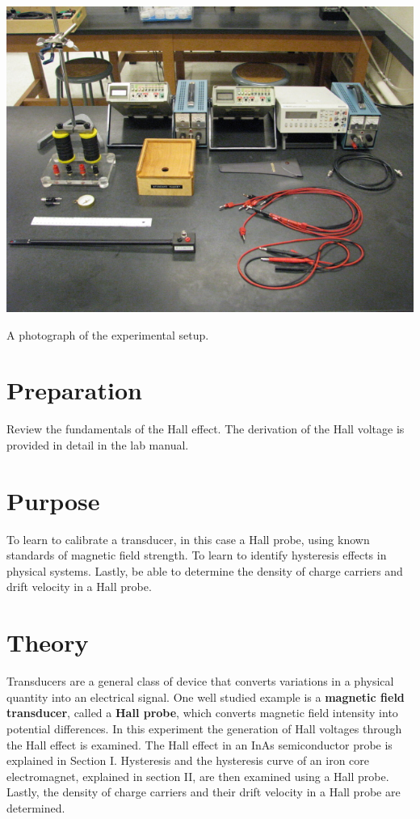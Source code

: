 \begin{marginfigure}[+2in]
\includegraphics{Hall-Effect-and-Magnetic-Hysteresis-Setup.jpg}
\caption{A photograph of the experimental setup.}
\label{fig:HEsetup}
\end{marginfigure}

\section{Preparation}
Review the fundamentals of the Hall effect. The derivation of the Hall voltage is provided in detail in the lab manual.

\section{Purpose}
To learn to calibrate a transducer, in this case a Hall probe, using known standards of magnetic field strength. To learn to identify hysteresis effects in physical systems. Lastly, be able to determine the density of charge carriers and drift velocity in a Hall probe.

\section{Theory}
Transducers are a general class of device that converts variations in a physical quantity into an electrical signal. One well studied example is a {\bf magnetic field transducer}, called a {\bf Hall probe}, which converts magnetic field intensity into potential differences. In this experiment the generation of Hall voltages through the Hall effect is examined. The Hall effect in an InAs semiconductor probe is explained in Section I. Hysteresis and the hysteresis curve of an iron core electromagnet, explained in section II,  are then examined using  a Hall probe. Lastly, the density of charge carriers and their drift velocity in a Hall probe are determined.

